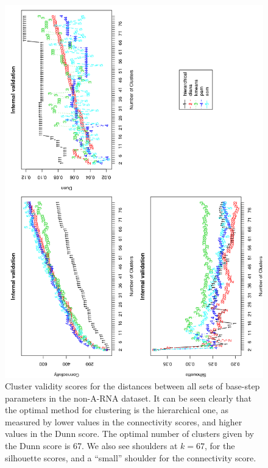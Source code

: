 \begin{figure}
 \centering
\includegraphics[angle=0, scale=0.72]{Chapter2/noarna_val.png}
\caption{Cluster validity scores for the distances between all sets of
  base-step  parameters in  the non-A-RNA  dataset.  It  can  be seen
  clearly that  the optimal method for clustering  is the hierarchical
  one, as  measured by  lower values in  the connectivity  scores, and
  higher values  in the  Dunn score.  The  optimal number  of clusters
  given by the Dunn score is  67. We also see shoulders at $k=67$, for
  the silhouette scores, and a ``small'' shoulder for the connectivity
  score.}
 \label{fig:noarna}
\end{figure}

